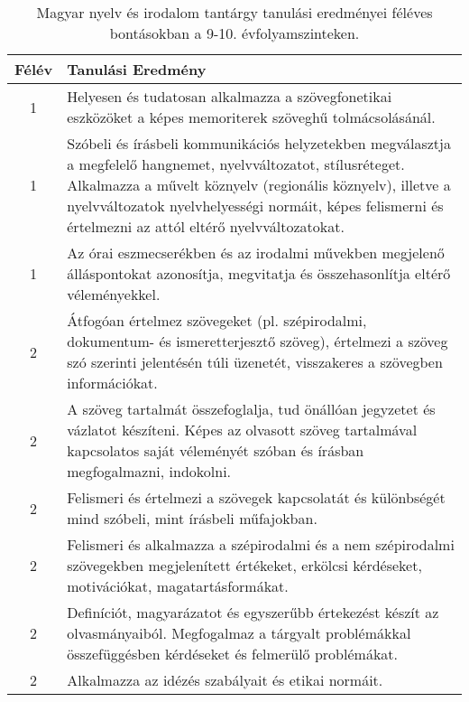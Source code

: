        
           \begin{longtable}{c | p{12cm} }
            \caption[Magyar nyelv és irodalom 9-10.]{Magyar nyelv és irodalom tantárgy tanulási eredményei féléves bontásokban a 9-10. évfolyamszinteken. }  \\

            \textbf{Félév} & \textbf{Tanulási Eredmény} \\
            \hline
            \endhead
                                
                                          1 &  Helyesen és tudatosan alkalmazza a szövegfonetikai eszközöket a képes memoriterek szöveghű tolmácsolásánál. \\ \hline
                                          1 &  Szóbeli és írásbeli kommunikációs helyzetekben megválasztja a megfelelő hangnemet, nyelvváltozatot, stílusréteget. Alkalmazza a művelt köznyelv (regionális köznyelv), illetve a nyelvváltozatok nyelvhelyességi normáit, képes felismerni és értelmezni az attól eltérő nyelvváltozatokat. \\ \hline
                                          1 &  Az órai eszmecserékben és az irodalmi művekben megjelenő álláspontokat azonosítja, megvitatja és összehasonlítja eltérő véleményekkel. \\ \hline
                                      
                                
                                          2 &  Átfogóan értelmez szövegeket (pl. szépirodalmi, dokumentum- és ismeretterjesztő szöveg), értelmezi a szöveg szó szerinti jelentésén túli üzenetét, visszakeres a szövegben információkat. \\ \hline
                                          2 &  A szöveg tartalmát összefoglalja, tud önállóan jegyzetet és vázlatot készíteni. Képes az olvasott szöveg tartalmával kapcsolatos saját véleményét szóban és írásban megfogalmazni, indokolni. \\ \hline
                                          2 &  Felismeri és értelmezi a szövegek kapcsolatát és különbségét mind szóbeli, mint írásbeli műfajokban. \\ \hline
                                          2 &  Felismeri és alkalmazza a szépirodalmi és a nem szépirodalmi szövegekben megjelenített értékeket, erkölcsi kérdéseket, motivációkat, magatartásformákat. \\ \hline
                                          2 &  Definíciót, magyarázatot és egyszerűbb értekezést készít az olvasmányaiból. Megfogalmaz a tárgyalt problémákkal összefüggésben kérdéseket és felmerülő problémákat. \\ \hline
                                          2 &  Alkalmazza az idézés szabályait és etikai normáit. \\ \hline
                                      

\end{longtable}
